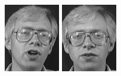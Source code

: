 \begin{figure}[ht]
 \includegraphics[width=\columnwidth/11]{ch3/figures/s2_9.png}
 \includegraphics[width=\columnwidth/11]{ch3/figures/s2_10.png}\\

\end{figure}
